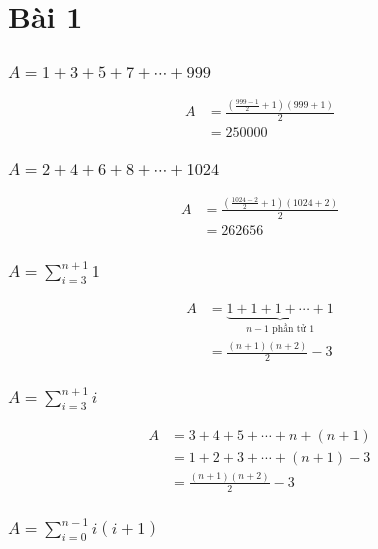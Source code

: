 \documentclass{article}
\begin{document}
\section{Bài 1}

\subsection{}

\subsubsection{$A= 1+3+5+7+\cdots+999$}

\[
\begin{aligned}
A &= \frac{(\frac{999-1}{2}+1)(999+1)}{2} \\
&= 250000
\end{aligned}
\]

\subsubsection{$A=2+4+6+8+\cdots+1024$}

\[
\begin{aligned}
A &= \frac{(\frac{1024-2}{2}+1)(1024+2)}{2} \\
&= 262656
\end{aligned}
\]

\subsubsection{$A=\sum_{i=3}^{n+1}1$}

\[
\begin{aligned}
A &= \underbrace{1+1+1+\cdots+1}_{\text{$n-1$ phần tử 1}} \\
&= \frac{(n+1)(n+2)}{2}-3 
\end{aligned}
\]


\subsubsection{$A=\sum_{i=3}^{n+1}i$}

\[
\begin{aligned}
A &= 3+4+5+\cdots+n+(n+1) \\
&= 1+2+3+\cdots+(n+1)-3 \\
&= \frac{(n+1)(n+2)}{2}-3 
\end{aligned}
\]

\subsubsection{$A=\sum_{i=0}^{n-1}i(i+1)$}
\end{document}
